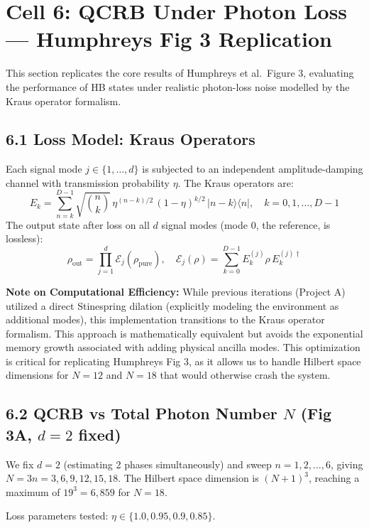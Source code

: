 \documentclass[12pt]{article}
\begin{document}
\section*{Cell 6: QCRB Under Photon Loss — Humphreys Fig 3 Replication}

This section replicates the core results of Humphreys et al.\ Figure 3, evaluating the performance of HB states under realistic photon-loss noise modelled by the Kraus operator formalism.

\subsection*{6.1 Loss Model: Kraus Operators}
Each signal mode $j \in \{1, \ldots, d\}$ is subjected to an independent amplitude-damping channel with transmission probability $\eta$. The Kraus operators are:
\begin{equation}
    E_k = \sum_{n=k}^{D-1} \sqrt{\binom{n}{k}} \, \eta^{(n-k)/2} \, (1-\eta)^{k/2} \, |n-k\rangle\langle n|, \quad k = 0, 1, \ldots, D-1
\end{equation}
The output state after loss on all $d$ signal modes (mode 0, the reference, is lossless):
\begin{equation}
    \rho_{\text{out}} = \prod_{j=1}^{d} \mathcal{E}_j(\rho_{\text{pure}}), \quad \mathcal{E}_j(\rho) = \sum_{k=0}^{D-1} E_k^{(j)} \rho \, E_k^{(j)\dagger}
\end{equation}

\textbf{Note on Computational Efficiency:} While previous iterations (Project A) utilized a direct Stinespring dilation (explicitly modeling the environment as additional modes), this implementation transitions to the Kraus operator formalism. This approach is mathematically equivalent but avoids the exponential memory growth associated with adding physical ancilla modes. This optimization is critical for replicating Humphreys Fig 3, as it allows us to handle Hilbert space dimensions for $N=12$ and $N=18$ that would otherwise crash the system.

\subsection*{6.2 QCRB vs Total Photon Number $N$ (Fig 3A, $d=2$ fixed)}
We fix $d=2$ (estimating 2 phases simultaneously) and sweep $n = 1, 2, \ldots, 6$, giving $N = 3n = 3, 6, 9, 12, 15, 18$. The Hilbert space dimension is $(N+1)^3$, reaching a maximum of $19^3 = 6{,}859$ for $N=18$.

Loss parameters tested: $\eta \in \{1.0, 0.95, 0.9, 0.85\}$.
\end{document}
